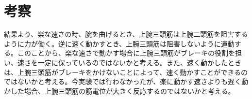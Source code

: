 \documentclass{jsarticle}
\begin{document}
  
\section{考察}
結果より、楽な速さの時、腕を曲げるとき、上腕三頭筋は上腕二頭筋を阻害するように力が働く。逆に速く動かすとき、上腕三頭筋は阻害しないように運動する。このことから、楽な速さで動かす場合に上腕三頭筋がブレーキの役割を担い、速さを一定に保っているのではないかと考える。また、速く動かしたときは、上腕三頭筋がブレーキをかけないことによって、速く動かすことができるのではないかと考える。今実験では行わなかったが、楽に動かす速さよりも遅く動かした場合、上腕三頭筋の筋電位が大きく反応するのではないかと考える。
\end{document}
